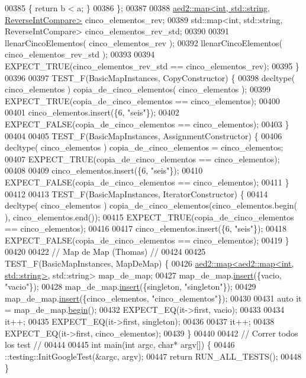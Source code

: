\begin{DoxyCode}
00385 \textcolor{keyword}{        }\{ \textcolor{keywordflow}{return} b < a; \}
00386     \};
00387 
00388     \hyperlink{classaed2_1_1map}{aed2::map<int, std::string, ReverseIntCompare>} cinco\_elementos\_rev;
00389     std::map<int, std::string, ReverseIntCompare> cinco\_elementos\_rev\_std;
00390 
00391     llenarCincoElementos( cinco\_elementos\_rev );
00392     llenarCincoElementos( cinco\_elementos\_rev\_std );
00393 
00394     EXPECT\_TRUE(cinco\_elementos\_rev\_std == cinco\_elementos\_rev);
00395 \}
00396 
00397 TEST\_F(BasicMapInstances, CopyConstructor) \{
00398     decltype( cinco\_elementos ) copia\_de\_cinco\_elementos( cinco\_elementos );
00399     EXPECT\_TRUE(copia\_de\_cinco\_elementos == cinco\_elementos);
00400 
00401     cinco\_elementos.insert(\{6, \textcolor{stringliteral}{"seis"}\});
00402     EXPECT\_FALSE(copia\_de\_cinco\_elementos == cinco\_elementos);
00403 \}
00404 
00405 TEST\_F(BasicMapInstances, AssignmentConstructor) \{
00406     decltype( cinco\_elementos ) copia\_de\_cinco\_elementos = cinco\_elementos;
00407     EXPECT\_TRUE(copia\_de\_cinco\_elementos == cinco\_elementos);
00408 
00409     cinco\_elementos.insert(\{6, \textcolor{stringliteral}{"seis"}\});
00410     EXPECT\_FALSE(copia\_de\_cinco\_elementos == cinco\_elementos);
00411 \}
00412 
00413 TEST\_F(BasicMapInstances, IteratorConstructor) \{
00414     decltype( cinco\_elementos ) copia\_de\_cinco\_elementos(cinco\_elementos.begin(
      ), cinco\_elementos.end());
00415     EXPECT\_TRUE(copia\_de\_cinco\_elementos == cinco\_elementos);
00416 
00417     cinco\_elementos.insert(\{6, \textcolor{stringliteral}{"seis"}\});
00418     EXPECT\_FALSE(copia\_de\_cinco\_elementos == cinco\_elementos);
00419 \}
00420 
00422 \textcolor{comment}{// Map de Map (Thomas) //}
00424 \textcolor{comment}{}
00425 TEST\_F(BasicMapInstances, MapDeMap) \{
00426     \hyperlink{classaed2_1_1map}{aed2::map<aed2::map<int, std::string>}, std::string> map\_de\_map;
00427     map\_de\_map.\hyperlink{classaed2_1_1map_a60aacba06b1579630b3c8e996cf248c8_a60aacba06b1579630b3c8e996cf248c8}{insert}(\{vacio, \textcolor{stringliteral}{"vacio"}\});
00428     map\_de\_map.\hyperlink{classaed2_1_1map_a60aacba06b1579630b3c8e996cf248c8_a60aacba06b1579630b3c8e996cf248c8}{insert}(\{singleton, \textcolor{stringliteral}{"singleton"}\});
00429     map\_de\_map.\hyperlink{classaed2_1_1map_a60aacba06b1579630b3c8e996cf248c8_a60aacba06b1579630b3c8e996cf248c8}{insert}(\{cinco\_elementos, \textcolor{stringliteral}{"cinco\_elementos"}\});
00430 
00431     \textcolor{keyword}{auto} it = map\_de\_map.\hyperlink{classaed2_1_1map_a58a95705d54b3dda7f775ce5a22225cb_a58a95705d54b3dda7f775ce5a22225cb}{begin}();
00432     EXPECT\_EQ(it->first, vacio);
00433 
00434     it++;
00435     EXPECT\_EQ(it->first, singleton);
00436 
00437     it++;
00438     EXPECT\_EQ(it->first, cinco\_elementos);
00439 \}
00440 
00442 \textcolor{comment}{// Correr todos los test //}
00444 \textcolor{comment}{}
00445 \textcolor{keywordtype}{int} main(\textcolor{keywordtype}{int} argc, \textcolor{keywordtype}{char}* argv[]) \{
00446     ::testing::InitGoogleTest(&argc, argv);
00447   \textcolor{keywordflow}{return} RUN\_ALL\_TESTS();
00448 \}
\end{DoxyCode}
